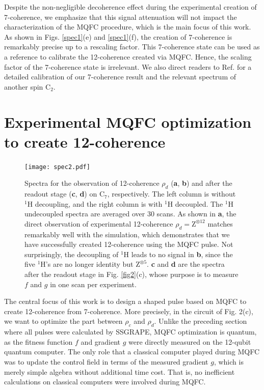 \documentclass[twocolumn,reprint, amsmath,amssymb,showpacs,superscriptaddress]{revtex4-1}
\begin{document}
Despite the non-negligible decoherence effect during the experimental creation of 7-coherence, we emphasize that this signal attenuation will not impact the characterization of the MQFC procedure, which is the main focus of this work. As shown in Figs. \ref{spec1}(e) and \ref{spec1}(f), the creation of 7-coherence is remarkably precise up to a rescaling factor. This 7-coherence state can be used as a reference to calibrate the 12-coherence created via MQFC. Hence, the scaling factor of the 7-coherence state is irrelevant. We also direct readers to Ref. \cite{lu2015experimental} for a detailed calibration of our 7-coherence result and the relevant spectrum of another spin C$_2$.

\section{E\lowercase{xperimental} MQFC \lowercase{optimization to create 12-coherence}} \label{12coh}

\begin{figure}
\begin{center}
\texttt{[image: spec2.pdf]}
\end{center}
\makeatletter
\renewcommand{\thefigure}{S\@arabic\c@figure}
\makeatother
\caption{Spectra for the observation of 12-coherence $\rho_d$ (\textbf{a}, \textbf{b}) and after the readout stage (\textbf{c}, \textbf{d}) on C$_7$, respectively. The left column is without $^1$H decoupling, and the right column is with $^1$H decoupled. The $^1$H undecoupled spectra are averaged over 30 scans. As shown in \textbf{a}, the direct observation of experimental 12-coherence $\rho_d = \text{Z}^{\otimes 12}$ matches remarkably well with the simulation, which demonstrates that we have successfully created 12-coherence using the MQFC pulse. Not surprisingly, the decoupling of $^1$H leads to no signal in \textbf{b}, since the five $^1$H's are no longer identity but $\text{Z}^{\otimes 5}$. \textbf{c} and \textbf{d} are the spectra after the readout stage in Fig. \ref{fig2}(c), whose purpose is to measure $f$ and $g$ in one scan per experiment. }
\label{spec2}
\end{figure}

The central focus of this work is to  design  a shaped pulse based on MQFC to create 12-coherence from 7-coherence. More precisely, in the circuit of Fig. 2(c),   we want to optimize  the part between $\rho_c$ and $\rho_d$. Unlike the preceding section where all pulses were calculated by   SSGRAPE,   MQFC optimization is   quantum, as the fitness function $f$ and gradient $g$ were directly measured on the 12-qubit quantum computer. The only role that a classical computer played during MQFC was to update the control field in terms of the measured gradient $g$, which is merely simple algebra without additional time cost. That is, no inefficient calculations on classical computers were involved during MQFC.
\end{document}

